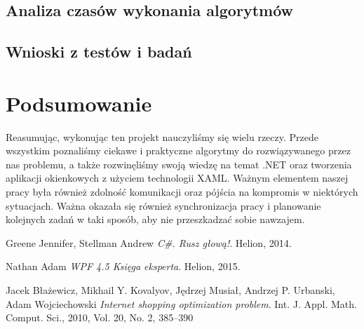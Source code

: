 \documentclass[a4paper]{article}
\let\oldsection\section
\renewcommand\section{\clearpage\oldsection}
\begin{document}
\subsection{Analiza czasów wykonania algorytmów}
\subsection{Wnioski z testów i badań}

\section{Podsumowanie}
Reasumując, wykonując ten projekt nauczyliśmy się wielu rzeczy. Przede wszystkim poznaliśmy ciekawe i praktyczne algorytmy do rozwiązywanego przez nas problemu, a także rozwinęliśmy swoją wiedzę na temat .NET oraz tworzenia aplikacji okienkowych z użyciem technologii XAML. Ważnym elementem naszej pracy była również zdolność komunikacji oraz pójścia na kompromis w niektórych sytuacjach. Ważna okazała się również synchronizacja pracy i planowanie kolejnych zadań w taki sposób, aby nie przeszkadzać sobie nawzajem.
\begin{thebibliography}{9}

  Greene Jennifer, Stellman Andrew 
  \emph{C\#. Rusz głową!}.
  Helion,
  2014.
  
	Nathan Adam
	\emph{WPF 4.5 Księga eksperta}. Helion, 2015.  
  
	Jacek Błażewicz, Mikhail Y. Kovalyov, Jędrzej Musiał, Andrzej P. Urbanski, Adam Wojciechowski
	\emph{Internet shopping optimization problem}.
	Int. J. Appl. Math. Comput. Sci., 2010, Vol. 20, No. 2, 385–390 
	
  \end{thebibliography}
\end{document}
